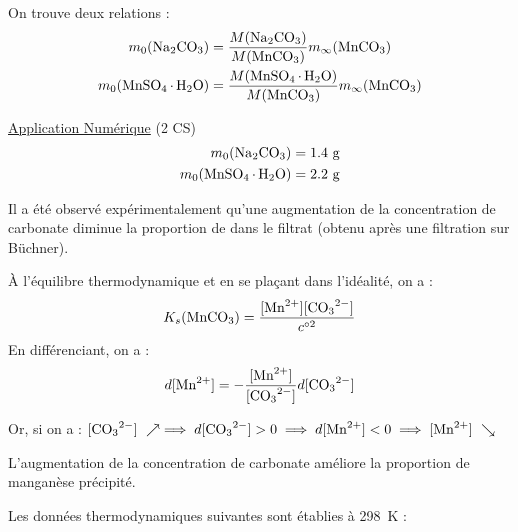 \documentclass[twoside,a4paper,11pt,addpoints,answers]{exam}%
\begin{document}
\begin{questions}
\begin{mybox}
\begin{solution}[6cm]
On trouve deux relations :
\begin{align*}
m_0 (\ce{Na2CO3}) & = \frac{M (\ce{Na2CO3})}{M( \ce{MnCO3} )} m_\infty ( \ce{MnCO3} ) \\
m_0 (\ce{MnSO4.H2O}) & = \frac{M (\ce{MnSO4.H2O})}{M( \ce{MnCO3} )} m_\infty ( \ce{MnCO3} )
\end{align*}

\underline{Application Numérique} (2 CS)
\begin{align*}
m_0 (\ce{Na2CO3}) &= 1.4 ~ \si{\gram}\\
m_0 (\ce{MnSO4.H2O}) &= 2.2 ~ \si{\gram}
\end{align*}
\end{solution}\end{mybox}

Il a été observé expérimentalement qu'une augmentation de la concentration de carbonate diminue la proportion de  dans le filtrat (obtenu après une filtration sur Büchner).


\begin{mybox}\begin{solution}[3cm]
\`{A} l'équilibre thermodynamique et en se plaçant dans l'idéalité, on a :
\begin{align*}
K_s ( \ce{MnCO3} ) = \frac{[\ce{Mn^{2+}}][\ce{CO3^{2-}}]}{c^{\circ 2}}
\end{align*}
En différenciant, on a :
\begin{align*}
d [ \ce{Mn^{2+}} ] = - \frac{[\ce{Mn^{2+}}]}{[\ce{CO3^{2-}}]} d [\ce{CO3^{2-}}]
\end{align*}

Or, si on a : $[\ce{CO3^{2-}}] ~ \nearrow \implies d[\ce{CO3^{2-}}] > 0 \implies d[\ce{Mn^{2+}}] < 0 \implies [\ce{Mn^{2+}}] ~ \searrow$

L'augmentation de la concentration de carbonate améliore la proportion de manganèse précipité.
\end{solution}\end{mybox}

Les données thermodynamiques suivantes sont établies à \SI{298}{\kelvin} : 


\end{questions}
\end{document}
